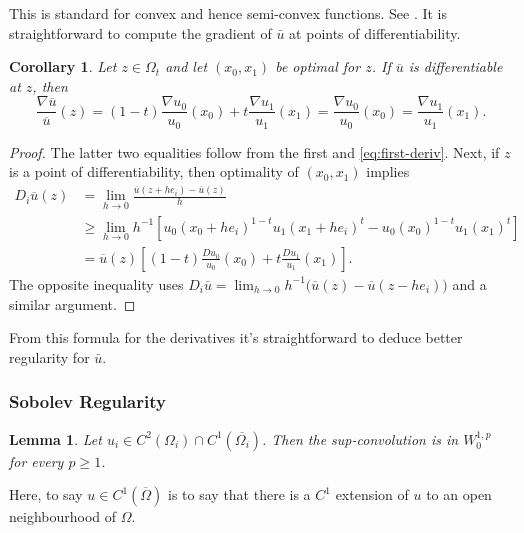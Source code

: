 \documentclass[12pt]{amsart}
\newtheorem{lem}[thm]{Lemma}
\newtheorem{cor}[thm]{Corollary}
\theoremstyle{definition}
\theoremstyle{remark}
\begin{document}
This is standard for convex and hence semi-convex functions. See \cite[Section
6.4]{zbMATH08010281}. It is straightforward to compute the gradient of $\bar{u}$
at points of differentiability.

\begin{cor}\label{eq:deriv-calc} Let $z \in \Omega_t$ and let $(x_0,x_1)$ be optimal
for $z$. If $\overline{u}$ is differentiable at $z$, then
\[ \frac{\nabla \overline{u}}{\overline{u}}(z) = (1-t)\frac{\nabla u_0}{u_0}(x_0) + t
\frac{\nabla u_1}{u_1}(x_1) = \frac{\nabla u_0}{u_0}(x_0) = \frac{\nabla u_1}{u_1}(x_1).
\]
\end{cor}
\begin{proof} The latter two equalities follow from the first and
\eqref{eq:first-deriv}. Next, if $z$ is a point of differentiability, then
optimality of $(x_0,x_1)$ implies
  \begin{align*} D_{i}\overline{u}(z) &= \lim_{h \rightarrow
0}\frac{\overline{u}(z+he_i)-\overline{u}(z)}{h}\\ &\geq \lim_{h \rightarrow
0}h^{-1}\left[u_0(x_0+he_i)^{1-t}u_1(x_1+he_i)^t-u_0(x_0)^{1-t}u_1(x_1)^t\right]\\
&= \overline{u}(z)\left[(1-t)\frac{Du_0}{u_0}(x_0) + t
\frac{Du_1}{u_1}(x_1)\right].
  \end{align*} The opposite inequality uses $ D_{i}\overline{u} = \lim_{h \rightarrow0}h^{-1}\big(\overline{u}(z)-\overline{u}(z-he_i)\big)$ and a similar argument.
\end{proof}
From this formula for the derivatives it's straightforward to deduce better
regularity for $\bar{u}$.
\subsubsection{Sobolev Regularity}
\label{sec:orgf5a19af}
\begin{lem}
  \label{org7214da8} Let \(u_i \in C^2(\Omega_i) \cap C^1(\overline{\Omega_i})\). Then the
sup-convolution is in \(W^{1,p}_0\) for every \(p \geq 1\).
\end{lem}

Here, to say \(u \in C^1(\overline{\Omega})\) is to say that there is a $C^1$ extension of $u$ to an open neighbourhood of $\Omega$.
\end{document}
